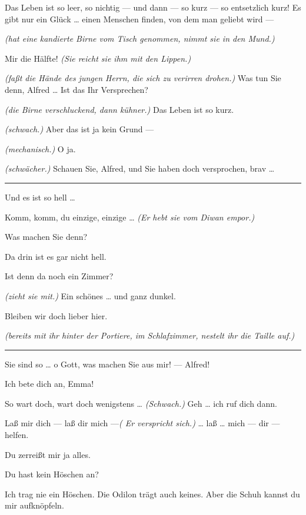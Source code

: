 \documentclass[
	final,
	a4paper,
	ngerman,
	mpinclude = true, %
	twoside = true,
	open = right,
	cleardoublepage = plain,
	DIV = 13,
	BCOR = 1cm,
	titlepage = firstiscover,
	]{scrbook}
\newcommand{\direction}[1]{\textit{(#1)}}
\newenvironment{deletion}{%
		\vspace{0.25\baselineskip}
		\hrule
		\vspace{0.25\baselineskip}
		\color{darkgray}
	}{
		\color{black}
		\vspace{0.25\baselineskip}
		\hrule 
		\vspace{0.25\baselineskip}
	}
\newcommand{\thecharacter}[1]{\textup{\textsc{#1}}\xspace}
\newcommand{\theherr}{\thecharacter{Benjamin}}
\newcommand{\thefrau}{\thecharacter{Emma}}
\newcommand{\character}[1]{\item[#1:]}
\newcommand{\herr}{\character{\theherr}}
\newcommand{\frau}{\character{\thefrau}}
\begin{document}
\begin{play}
	\herr
	Das Leben ist so leer, so nichtig --- und dann --- so kurz --- so entsetzlich kurz! Es gibt nur ein Glück \ldots{} einen Menschen finden, von dem man geliebt wird ---

	\frau
	\direction{hat eine kandierte Birne vom Tisch genommen, nimmt sie in den Mund.}

	\herr
	Mir die Hälfte! \direction{Sie reicht sie ihm mit den Lippen.}

	\frau
	\direction{faßt die Hände des jungen Herrn, die sich zu verirren drohen.} Was tun Sie denn, Alfred \ldots{} Ist das Ihr Versprechen?

	\herr
	\direction{die Birne verschluckend, dann kühner.} Das Leben ist so kurz.

	\frau
	\direction{schwach.} Aber das ist ja kein Grund ---

	\herr
	\direction{mechanisch.} O ja.

	\frau
	\direction{schwächer.} Schauen Sie, Alfred, und Sie haben doch versprochen, brav \ldots{}
	\begin{deletion}
	Und es ist so hell \ldots{}

	\herr
	Komm, komm, du einzige, einzige \ldots{} \direction{Er hebt sie vom Diwan empor.}

	\frau
	Was machen Sie denn?

	\herr
	Da drin ist es gar nicht hell.

	\frau
	Ist denn da noch ein Zimmer?

	\herr
	\direction{zieht sie mit.} Ein schönes \ldots{} und ganz dunkel.

	\frau
	Bleiben wir doch lieber hier.

	\herr
	\direction{bereits mit ihr hinter der Portiere, im Schlafzimmer, nestelt ihr die Taille auf.}

	\frau
	\end{deletion}
	Sie sind so \ldots{} o Gott, was machen Sie aus mir! --- Alfred!

	\herr
	Ich bete dich an, Emma!

	\frau
	So wart doch, wart doch wenigstens \ldots{} \direction{Schwach.} Geh \ldots{} ich ruf dich dann.

	\herr
	Laß mir dich --- laß dir mich ---\direction{ Er verspricht sich.} \ldots{} laß \ldots{} mich --- dir --- helfen.

	\frau
	Du zerreißt mir ja alles.

	\herr
	Du hast kein Höschen an?

	\frau
	Ich trag nie ein Höschen. Die Odilon trägt auch keines. Aber die Schuh kannst du mir aufknöpfeln.


\end{play}
\end{document}
